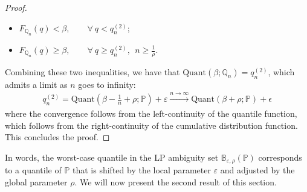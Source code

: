 \documentclass[11pt,a4paper]{article}
\begin{document}
\begin{proof}
\begin{itemize}
    \item $F_{\mathbb{Q}_n}(q)  < \beta, \qquad\forall~q<q^{(2)}_n$;
    \item $F_{\mathbb{Q}_n}(q)  \geq \beta, \qquad\forall~q\geq q^{(2)}_n, ~~n\geq \frac{1}{\rho}$.
\end{itemize}
Combining these two inequalities, we have that $\text{Quant}(\beta; \mathbb{Q}_n) = q^{(2)}_n$, which admits a limit as $n$ goes to infinity:
\begin{align*}
    q^{(2)}_n = \text{Quant} \left(\beta-\frac{1}{n}+\rho;\mathbb P \right)+\varepsilon
    \stackrel{n\rightarrow\infty}{\longrightarrow} \text{Quant}(\beta+\rho; \mathbb P)+\epsilon
\end{align*}
where the convergence follows from the left-continuity of the quantile function, which follows from the right-continuity of the cumulative distribution function. This concludes the proof.
\end{proof}



In words, the worst-case quantile in the LP ambiguity set $\mathbb{B}_{\varepsilon, \rho}(\mathbb{P})$ corresponds to a quantile of $\mathbb{P}$ that is shifted by the local parameter $\varepsilon$ and adjusted by the global parameter $\rho$. We will now present the second result of this section.
\end{document}
